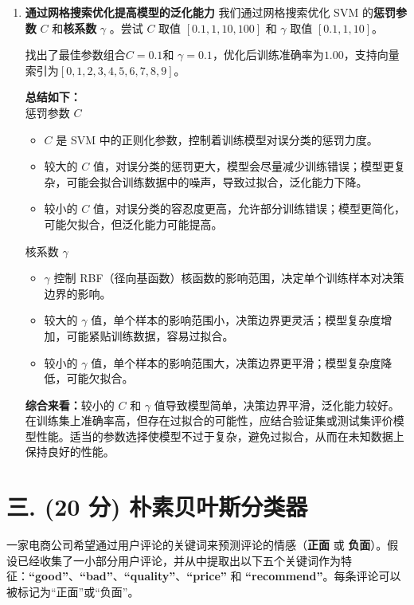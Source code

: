 \documentclass[8pt]{article}
\begin{document}
\begin{enumerate}
    \item \textbf{通过网格搜索优化提高模型的泛化能力} 
    我们通过网格搜索优化 SVM 的\textbf{惩罚参数} \(C\) 和\textbf{核系数} \( \gamma \) 。尝试 \( C \) 取值 \([0.1, 1, 10, 100]\) 和 \( \gamma \) 取值 \([0.1, 1, 10]\)。
    
    找出了最佳参数组合\( C = 0.1 \)和 \( \gamma  = 0.1\)，优化后训练准确率为\(1.00\)，支持向量索引为\([0, 1, 2, 3, 4, 5, 6, 7, 8, 9]\)。
    
    \textbf{总结如下：} \\
    惩罚参数 \(C\)
    \begin{itemize} 
        \item \(C\) 是 SVM 中的正则化参数，控制着训练模型对误分类的惩罚力度。
        \item 较大的 \(C\) 值，对误分类的惩罚更大，模型会尽量减少训练错误；模型更复杂，可能会拟合训练数据中的噪声，导致过拟合，泛化能力下降。
        \item 较小的 \(C\) 值，对误分类的容忍度更高，允许部分训练错误；模型更简化，可能欠拟合，但泛化能力可能提高。
    \end{itemize}
    核系数 \(\gamma\)
    \begin{itemize} 
        \item \(\gamma\) 控制 RBF（径向基函数）核函数的影响范围，决定单个训练样本对决策边界的影响。
        \item 较大的 \(\gamma\) 值，单个样本的影响范围小，决策边界更灵活；模型复杂度增加，可能紧贴训练数据，容易过拟合。
        \item 较小的 \(\gamma\) 值，单个样本的影响范围大，决策边界更平滑；模型复杂度降低，可能欠拟合。
    \end{itemize}
    \textbf{综合来看：}较小的 \(C\) 和 \(\gamma\) 值导致模型简单，决策边界平滑，泛化能力较好。在训练集上准确率高，但存在过拟合的可能性，应结合验证集或测试集评价模型性能。适当的参数选择使模型不过于复杂，避免过拟合，从而在未知数据上保持良好的性能。
\end{enumerate}

\vspace{3em}

\section*{三. (20 分) 朴素贝叶斯分类器}
一家电商公司希望通过用户评论的关键词来预测评论的情感（\textbf{正面} 或 \textbf{负面}）。假设已经收集了一小部分用户评论，并从中提取出以下五个关键词作为特征：\textbf{“good”}、\textbf{“bad”}、\textbf{“quality”}、\textbf{“price”} 和 \textbf{“recommend”}。每条评论可以被标记为“正面”或“负面”。
\end{document}
